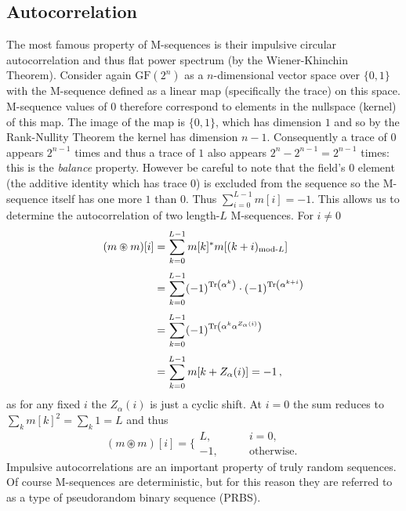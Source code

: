 \documentclass[twocolumn]{revtex4-2}
\begin{document}
\subsection{Autocorrelation}
The most famous property of M-sequences is their impulsive circular autocorrelation and thus flat power spectrum (by the Wiener-Khinchin Theorem).
Consider again $\text{GF}(2^n)$ as a $n$-dimensional vector space over $\{0,1\}$ with the M-sequence defined as a linear map (specifically the trace) on this space. 
M-sequence values of $0$ therefore correspond to elements in the nullspace (kernel) of this map. 
The image of the map is $\{0,1\}$, which has dimension $1$ and so by the Rank-Nullity Theorem the kernel has dimension $n-1$.
Consequently a trace of $0$ appears $2^{n-1}$ times and thus a trace of $1$ also appears $2^n - 2^{n-1} = 2^{n-1}$ times: this is the \emph{balance} property.
However be careful to note that the field's $0$ element (the additive identity which has trace $0$) is excluded from the sequence so the M-sequence itself has one more $1$ than $0$.
Thus $\sum_{i=0}^{L-1} m[i] = -1$. This allows us to determine the autocorrelation of two length-$L$ M-sequences. For $i \neq0$
\begin{alignat}{2}
    (m \circledast m)[i] &= \sum_{k=0}^{L-1} m[k]^* m[(k+i)_{\text{mod-}L}] \\[0.1cm]
    &= \sum_{k=0}^{L-1} (-1)^{\Tr(\alpha^k)} \cdot (-1)^{\Tr(\alpha^{k+i})} \nonumber \\[0.1cm]
    &= \sum_{k=0}^{L-1} (-1)^{\Tr(\alpha^k \alpha^{Z_\alpha(i)})} \nonumber \\[0.1cm]
    &= \sum_{k=0}^{L-1} m[k + Z_\alpha(i)] = -1 \nonumber \, ,
\end{alignat}
as for any fixed $i$ the $Z_\alpha(i)$ is just a cyclic shift. At $i=0$ the sum reduces to $\sum_k m[k]^2 = \sum_{k} 1 = L$ and thus
\begin{equation}
    (m \circledast m)[i] = \Bigg\{
    \begin{array}{cc}
        L, & \qquad i=0, \\
        -1, & \qquad \text{otherwise}.
    \end{array}
\end{equation}
Impulsive autocorrelations are an important property of truly random sequences. 
Of course M-sequences are deterministic, but for this reason they are referred to as a type of pseudorandom binary sequence (PRBS).
\end{document}
